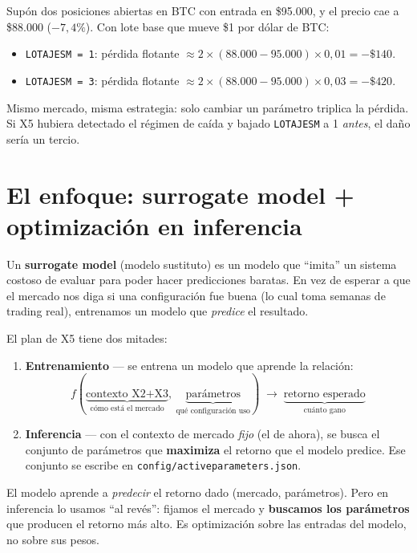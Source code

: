 \documentclass[11pt,a4paper]{report}
\newcommand{\code}[1]{\texttt{\def\_{\textunderscore\allowbreak}#1}}
\begin{document}
\begin{ejemplo}
Supón dos posiciones abiertas en BTC con entrada en \$95.000, y el precio cae a \$88.000
($-7,4\%$). Con lote base que mueve \$1 por dólar de BTC:
\begin{itemize}[itemsep=1pt]
  \item \code{LOTAJES\_M = 1}: pérdida flotante $\approx 2 \times (88.000-95.000) \times 0{,}01 = -\$140$.
  \item \code{LOTAJES\_M = 3}: pérdida flotante $\approx 2 \times (88.000-95.000) \times 0{,}03 = -\$420$.
\end{itemize}
Mismo mercado, misma estrategia: solo cambiar un parámetro triplica la pérdida. Si X5 hubiera
detectado el régimen de caída y bajado \code{LOTAJES\_M} a 1 \emph{antes}, el daño sería un tercio.
\end{ejemplo}

\section{El enfoque: surrogate model + optimización en inferencia}

Un \textbf{surrogate model} (modelo sustituto) es un modelo que ``imita'' un sistema costoso de
evaluar para poder hacer predicciones baratas. En vez de esperar a que el mercado nos diga si
una configuración fue buena (lo cual toma semanas de trading real), entrenamos un modelo que
\emph{predice} el resultado.

El plan de X5 tiene dos mitades:

\begin{enumerate}[leftmargin=1.5em]
  \item \textbf{Entrenamiento} — se entrena un modelo que aprende la relación:
  \[
    f(\underbrace{\text{contexto X2+X3}}_{\text{cómo está el mercado}},\ \underbrace{\text{parámetros}}_{\text{qué configuración uso}}) \;\longrightarrow\; \underbrace{\text{retorno esperado}}_{\text{cuánto gano}}
  \]
  \item \textbf{Inferencia} — con el contexto de mercado \emph{fijo} (el de ahora), se busca el
  conjunto de parámetros que \textbf{maximiza} el retorno que el modelo predice. Ese conjunto se
  escribe en \code{config/active\_parameters.json}.
\end{enumerate}

\begin{idea}
El modelo aprende a \emph{predecir} el retorno dado (mercado, parámetros). Pero en inferencia lo
usamos ``al revés'': fijamos el mercado y \textbf{buscamos los parámetros} que producen el
retorno más alto. Es optimización sobre las entradas del modelo, no sobre sus pesos.
\end{idea}
\end{document}
